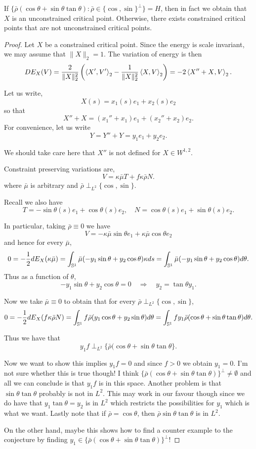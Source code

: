 \documentclass[12pt]{article}
\begin{document}
{\color{red} If \(\{\bar{\rho} (\cos\theta + \sin\theta\tan\theta) : \bar{\rho} \in \{\cos, \sin\}^{\perp}\} = H\), then in fact we obtain that \(X\) is an unconstrained critical point. Otherwise, there exists constrained critical points that are not unconstrained critical points.}

\begin{proof}
Let \(X\) be a constrained critical point. Since the energy is scale invariant, we may assume that \(\|X\|_2 = 1\). The variation of energy is then
\[
DE_X (V) = \frac{2}{\|X\|_2^2} \left(\left\langle{X'},{V'}\right\rangle_2 - \frac{1}{\|X\|_2^2}\left\langle{X},{V}\right\rangle_2\right) = -2 \left\langle{X'' + X},{V}\right\rangle_2.
\]

Let us write,
\[
X(s) = x_1(s) e_1 + x_2(s) e_2
\]
so that
\[
X'' + X = (x_1'' + x_1)e_1 + (x_2'' + x_2)e_2.
\]
For convenience, let us write
\[
Y = Y'' + Y = y_1 e_1 + y_2 e_2.
\]

{\color{red} We should take care here that \(X''\) is not defined for \(X \in W^{1,2}\).}

Constraint preserving variations are,
\[
V = \kappa \bar{\mu} T + f\kappa\bar{\rho} N.
\]
where \(\bar{\mu}\) is arbitrary and \(\bar{\rho} \perp_{L^2} \{\cos,\sin\}\).

Recall we also have
\[
T = -\sin \theta(s) e_1 + \cos \theta(s) e_2, \quad N = \cos \theta(s) e_1 + \sin \theta(s) e_2.
\]

In particular, taking \(\bar{\rho} \equiv 0\) we have
\[
V = -\kappa\bar{\mu}\sin\theta e_1 + \kappa\bar{\mu}\cos\theta e_2
\]
and hence for every \(\bar{\mu}\),
\[
0 = -\frac{1}{2} dE_X(\kappa\bar{\mu}) = \int_{\operatorname{\mathbb{S}^1}} \bar{\mu}(-y_1 \sin\theta + y_2 \cos\theta) \kappa ds = \int_{\operatorname{\mathbb{S}^1}} \bar{\mu}(-y_1 \sin\theta + y_2 \cos\theta) d\theta.
\]
Thus as a function of \(\theta\),
\[
-y_1 \sin\theta + y_2 \cos\theta = 0 \quad \Rightarrow \quad y_2 = \tan\theta y_1.
\]

Now we take \(\bar{\mu} \equiv 0\) to obtain that for every \(\bar{\rho} \perp_{L^2} \{\cos,\sin\}\),
\[
0 = -\frac{1}{2} dE_X(f\kappa\bar{\rho} N) = \int_{\operatorname{\mathbb{S}^1}} f\bar{\rho}(y_1 \cos\theta + y_2 \sin\theta) d\theta = \int_{\operatorname{\mathbb{S}^1}} f y_1 \bar{\rho}(\cos\theta + \sin\theta\tan\theta) d\theta.
\]

Thus we have that
\[
y_1 f \perp_{L^2} \{\bar{\rho}(\cos\theta + \sin\theta\tan\theta\}.
\]

{\color{red} Now we want to show this implies $y_1f = 0$ and since \(f > 0\) we obtain \(y_1 = 0\). I'm not sure whether this is true though! I think \(\{\bar{\rho}(\cos\theta + \sin\theta\tan\theta)\}^{\perp} \ne \emptyset\) and all we can conclude is that \(y_1 f\) is in this space. Another problem is that \(\sin\theta\tan\theta\) probably is not in \(L^2\). This may work in our favour though since we do have that \(y_1 \tan\theta = y_2\) is in \(L^2\) which restricts the possibilities for \(y_1\) which is what we want. Lastly note that if \(\bar{\rho} = \cos\theta\), then \(\bar{\rho} \sin\theta\tan\theta\) is in \(L^2\).

On the other hand, maybe this shows how to find a counter example to the conjecture by finding \(y_1 \in \{\bar{\rho}(\cos\theta + \sin\theta\tan\theta)\}^{\perp}\)!}
\end{proof}
\end{document}
